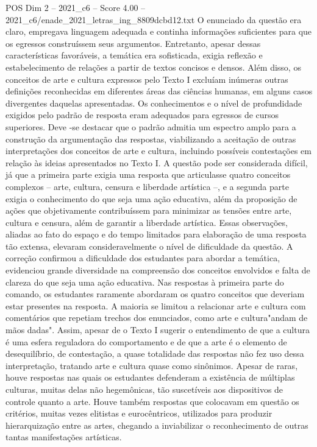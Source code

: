 \begin{textsample}{POS Dim 2 – 2021\_c6 – Score 4.00 – 2021\_c6/enade\_2021\_letras\_ing\_8809dcbd12.txt}
O enunciado da questão era claro, empregava linguagem adequada e continha informações suficientes para que os egressos construíssem seus argumentos.
Entretanto, apesar dessas características favoráveis, a temática era sofisticada, exigia reflexão e estabelecimento de relações a partir de textos concisos e densos.
Além disso, os conceitos de arte e cultura expressos pelo Texto I excluíam inúmeras outras definições reconhecidas em diferentes áreas das ciências humanas, em alguns casos divergentes daquelas apresentadas.
Os conhecimentos e o nível de profundidade exigidos pelo padrão de resposta eram adequados para egressos de cursos superiores.
Deve -se destacar que o padrão admitia um espectro amplo para a construção da argumentação das respostas, viabilizando a aceitação de outras interpretações dos conceitos de arte e cultura, incluindo possíveis contestações em relação às ideias apresentados no Texto I.
A questão pode ser considerada difícil, já que a primeira parte exigia uma resposta que articulasse quatro conceitos complexos – arte, cultura, censura e liberdade artística –, e a segunda parte exigia o conhecimento do que seja uma ação educativa, além da proposição de ações que objetivamente contribuíssem para minimizar as tensões entre arte, cultura e censura, além de garantir a liberdade artística.
Essas observações, aliadas ao fato do espaço e do tempo limitados para elaboração de uma resposta tão extensa, elevaram consideravelmente o nível de dificuldade da questão.
A correção confirmou a dificuldade dos estudantes para abordar a temática, evidenciou grande diversidade na compreensão dos conceitos envolvidos e falta de clareza do que seja uma ação educativa.
Nas respostas à primeira parte do comando, os estudantes raramente abordaram os quatro conceitos que deveriam estar presentes na resposta.
A maioria se limitou a relacionar arte e cultura com comentários que repetiam trechos dos enunciados, como arte e cultura"andam de mãos dadas".
Assim, apesar de o Texto I sugerir o entendimento de que a cultura é uma esfera reguladora do comportamento e de que a arte é o elemento de desequilíbrio, de contestação, a quase totalidade das respostas não fez uso dessa interpretação, tratando arte e cultura quase como sinônimos.
Apesar de raras, houve respostas nas quais os estudantes defenderam a existência de múltiplas culturas, muitas delas não hegemônicas, tão suscetíveis aos dispositivos de controle quanto a arte.
Houve também respostas que colocavam em questão os critérios, muitas vezes elitistas e eurocêntricos, utilizados para produzir hierarquização entre as artes, chegando a inviabilizar o reconhecimento de outras tantas manifestações artísticas.

\end{textsample}
